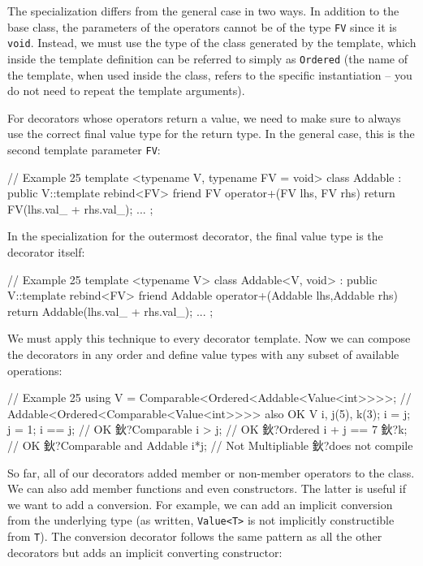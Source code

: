 The specialization differs from the general case in two ways. In addition to the base class, the parameters of the operators cannot be of the type \texttt{FV} since it is \texttt{void}. Instead, we must use the type of the class generated by the template, which inside the template definition can be referred to simply as \texttt{Ordered} (the name of the template, when used inside the class, refers to the specific instantiation -- you do not need to repeat the template arguments).

For decorators whose operators return a value, we need to make sure to always use the correct final value type for the return type. In the general case, this is the second template parameter \texttt{FV}:

\begin{code}
// Example 25
template <typename V, typename FV = void> class Addable :
  public V::template rebind<FV> {
  friend FV operator+(FV lhs, FV rhs) {
    return FV(lhs.val_ + rhs.val_);
  }
  ...
};
\end{code}

In the specialization for the outermost decorator, the final value type is the decorator itself:

\begin{code}
// Example 25
template <typename V> class Addable<V, void> :
  public V::template rebind<FV> {
  friend Addable operator+(Addable lhs,Addable rhs) {
    return Addable(lhs.val_ + rhs.val_);
  }
  ...
};
\end{code}

We must apply this technique to every decorator template. Now we can compose the decorators in any order and define value types with any subset of available operations:

\begin{code}
// Example 25
using V = Comparable<Ordered<Addable<Value<int>>>>;
// Addable<Ordered<Comparable<Value<int>>>> also OK
V i, j(5), k(3);
i = j; j = 1;
i == j;         // OK 鈥?Comparable
i > j;        // OK 鈥?Ordered
i + j == 7 鈥?k;    // OK 鈥?Comparable and Addable
i*j;             // Not Multipliable 鈥?does not compile
\end{code}

So far, all of our decorators added member or non-member operators to the class. We can also add member functions and even constructors. The latter is useful if we want to add a conversion. For example, we can add an implicit conversion from the underlying type (as written, \texttt{Value\textless{}T\textgreater{}} is not implicitly constructible from \texttt{T}). The conversion decorator follows the same pattern as all the other decorators but adds an implicit converting constructor:

